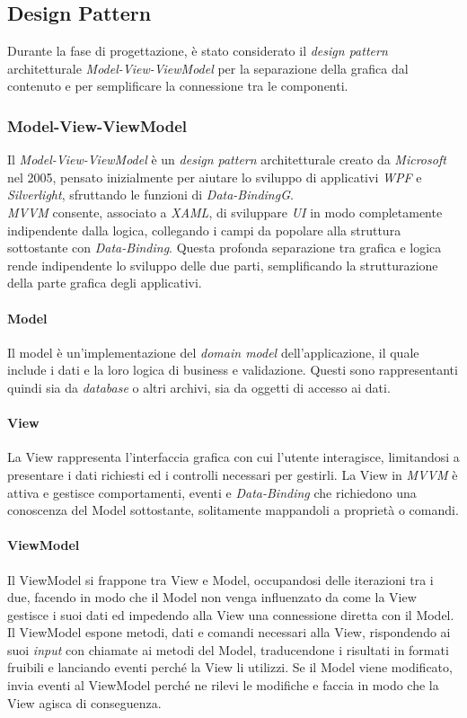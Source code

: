 \subsection{Design Pattern}
Durante la fase di progettazione, è stato considerato il \textit{design pattern} architetturale \textit{Model-View-ViewModel} per la separazione della grafica dal contenuto e per semplificare la connessione tra le componenti.
\subsubsection{Model-View-ViewModel}
Il \textit{Model-View-ViewModel} è un \textit{design pattern} architetturale creato da \textit{Microsoft} nel 2005, pensato inizialmente per aiutare lo sviluppo di applicativi \textit{WPF} e \textit{Silverlight}, sfruttando le funzioni di \textit{Data-Binding\textit{G}}.
\\
\textit{MVVM} consente, associato a \textit{XAML}, di sviluppare \textit{UI} in modo completamente indipendente dalla logica, collegando i campi da popolare alla struttura sottostante con \textit{Data-Binding}. Questa profonda separazione tra grafica e logica rende indipendente lo sviluppo delle due parti, semplificando la strutturazione della parte grafica degli applicativi.

\paragraph{Model}
Il model è un'implementazione del \textit{domain model} dell'applicazione, il quale include i dati e la loro logica di business e validazione. Questi sono rappresentanti quindi sia da \textit{database} o altri archivi, sia da oggetti di accesso ai dati.
\paragraph{View}
La View rappresenta l'interfaccia grafica con cui l'utente interagisce, limitandosi a presentare i dati richiesti ed i controlli necessari per gestirli. La View in \textit{MVVM} è attiva e gestisce comportamenti, eventi e \textit{Data-Binding} che richiedono una conoscenza del Model sottostante, solitamente mappandoli a proprietà o comandi.
\paragraph{ViewModel}
Il ViewModel si frappone tra View e Model, occupandosi delle iterazioni tra i due, facendo in modo che il Model non venga influenzato da come la View gestisce i suoi dati ed impedendo alla View una connessione diretta con il Model. Il ViewModel espone metodi, dati e comandi necessari alla View, rispondendo ai suoi \textit{input} con chiamate ai metodi del Model, traducendone i risultati in formati fruibili e lanciando eventi perché la View li utilizzi. Se il Model viene modificato, invia eventi al ViewModel perché ne rilevi le modifiche e faccia in modo che la View agisca di conseguenza.

